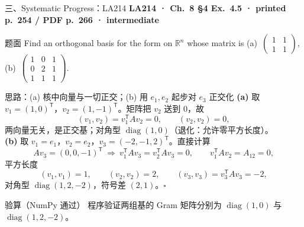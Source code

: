 \documentclass[aspectratio=169,10pt,fontset=none]{ctexbeamer}
\newcommand{\ex}[1]{\textcolor{accent}{\footnotesize\bfseries #1}}
\begin{document}
\begin{frame}[t]{三、Systematic Progress：LA214}
  \leavevmode\ex{LA214 · Ch.~8 §4 Ex.~4.5 · printed p.~254 / PDF p.~266 · intermediate}
  \begin{block}{\footnotesize 题面}
    \scriptsize Find an orthogonal basis for the form on $\mathbb R^n$ whose matrix is (a)~$\begin{pmatrix}1&1\\1&1\end{pmatrix}$, (b)~$\begin{pmatrix}1&0&1\\0&2&1\\1&1&1\end{pmatrix}$.
  \end{block}
  \begin{exampleblock}{\footnotesize 思路：(a) 核中向量与一切正交；(b) 用 $e_1,e_2$ 起步对 $e_3$ 正交化}
    \scriptsize
    \textbf{(a)} 取 $v_1=(1,0)^{\mathsf T}$，$v_2=(1,-1)^{\mathsf T}$。矩阵把 $v_2$ 送到 $0$，故
    $$(v_1,v_2)=v_1^{\mathsf T}Av_2=0,\qquad (v_2,v_2)=0,$$
    两向量无关，是正交基；对角型 $\operatorname{diag}(1,0)$（退化：允许零平方长度）。\\[2pt]
    \textbf{(b)} 取 $v_1=e_1$，$v_2=e_2$，$v_3=(-2,-1,2)^{\mathsf T}$。直接计算
    $$Av_3=(0,0,-1)^{\mathsf T}\ \Longrightarrow\ v_1^{\mathsf T}Av_3=v_2^{\mathsf T}Av_3=0,\qquad v_1^{\mathsf T}Av_2=A_{12}=0,$$
    平方长度
    $$(v_1,v_1)=1,\qquad (v_2,v_2)=2,\qquad (v_3,v_3)=v_3^{\mathsf T}Av_3=-2,$$
    对角型 $\operatorname{diag}(1,2,-2)$，符号差 $(2,1)$。$\square$
  \end{exampleblock}
  \begin{block}{\footnotesize 验算（NumPy 通过）}
    \scriptsize 程序验证两组基的 Gram 矩阵分别为 $\operatorname{diag}(1,0)$ 与 $\operatorname{diag}(1,2,-2)$。
  \end{block}
\end{frame}
\end{document}
